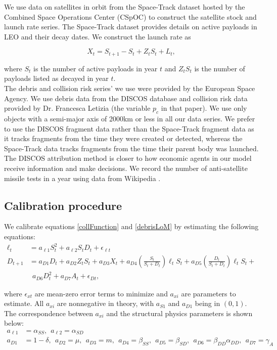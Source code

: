 \documentclass[12pt]{article}
\begin{document}
We use data on satellites in orbit from the Space-Track dataset hosted by the Combined Space Operations Center (CSpOC) \citep{spacetrackData} to construct the satellite stock and launch rate series. The Space-Track dataset provides details on active payloads in LEO and their decay dates. We construct the launch rate as

\begin{equation}
X_t = S_{t+1} - S_t + Z_tS_t + L_t,
\end{equation}

where $S_t$ is the number of active payloads in year $t$ and $Z_tS_t$ is the number of payloads listed as decayed in year $t$. \\

The debris and collision risk series' we use were provided by the European Space Agency. We use debris data from the DISCOS database \citep{FRAGdata} and collision risk data provided by Dr. Francesca Letizia \citep{ECOBdata} (the variable $p_c$ in that paper). We use only objects with a semi-major axis of 2000km or less in all our data series. We prefer to use the DISCOS fragment data rather than the Space-Track fragment data as it tracks fragments from the time they were created or detected, whereas the Space-Track data tracks fragments from the time their parent body was launched. The DISCOS attribution method is closer to how economic agents in our model receive information and make decisions. We record the number of anti-satellite missile tests in a year using data from Wikipedia \citep{ASATdata}.


\subsection{Calibration procedure}
We calibrate equations \ref{collFunction} and \ref{debrisLoM} by estimating the following equations:
\begin{align}
\label{riskEstimation}
\ell_t &= a_{\ell 1} S_t^2 + a_{\ell 2} S_t D_t + \epsilon_{\ell t}  \\
\label{debLoMEstimation}
D_{t+1} &= a_{D 1} D_t + a_{D 2}Z_tS_t + a_{D 3} X_t  + a_{D4} \left( \frac{S_t}{S_t+D_t} \right ) \ell_t S_t + a_{D5}\left( \frac{D_t}{S_t+D_t} \right ) \ell_t S_t + \\
&~~  a_{D6} D_t^2 + a_{D7}A_t + \epsilon_{D t},
\end{align}

where $\epsilon_{xt}$ are mean-zero error terms to minimize and $a_{xi}$ are parameters to estimate. All $a_{xi}$ are nonnegative in theory, with $a_{S1}$ and $a_{D1}$ being in $(0,1)$. The correspondence between $a_{xi}$ and the structural physics parameters is shown below:
\begin{align*}
a_{\ell 1} &= \alpha_{SS}, ~~ a_{\ell 2} = \alpha_{SD} \\
a_{D1} &= 1-\delta, ~~ a_{D 2} = \mu, ~~ a_{D 3} = m, ~~ a_{D4} = \beta_{SS}, ~~ a_{D5} = \beta_{SD}, ~~ a_{D6} = \beta_{DD}\alpha_{DD}, ~~ a_{D7} = \gamma_A
\end{align*}
\end{document}
